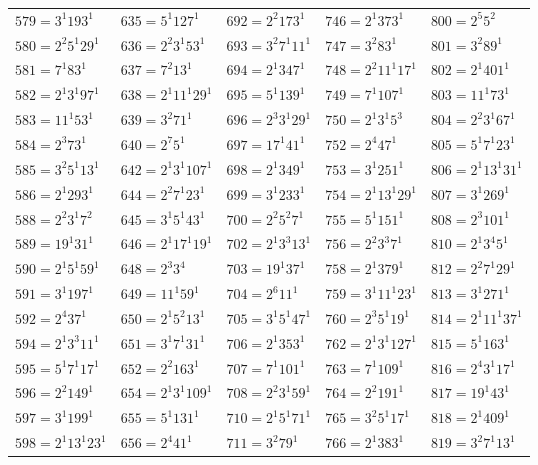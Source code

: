 {\begin{longtable}[c]{*{5}{l}}
$579=3^{1}193^{1}$&$635=5^{1}127^{1}$&$692=2^{2}173^{1}$&$746=2^{1}373^{1}$&$800=2^{5}5^{2}$\\
$580=2^{2}5^{1}29^{1}$&$636=2^{2}3^{1}53^{1}$&$693=3^{2}7^{1}11^{1}$&$747=3^{2}83^{1}$&$801=3^{2}89^{1}$\\
$581=7^{1}83^{1}$&$637=7^{2}13^{1}$&$694=2^{1}347^{1}$&$748=2^{2}11^{1}17^{1}$&$802=2^{1}401^{1}$\\
$582=2^{1}3^{1}97^{1}$&$638=2^{1}11^{1}29^{1}$&$695=5^{1}139^{1}$&$749=7^{1}107^{1}$&$803=11^{1}73^{1}$\\
$583=11^{1}53^{1}$&$639=3^{2}71^{1}$&$696=2^{3}3^{1}29^{1}$&$750=2^{1}3^{1}5^{3}$&$804=2^{2}3^{1}67^{1}$\\
$584=2^{3}73^{1}$&$640=2^{7}5^{1}$&$697=17^{1}41^{1}$&$752=2^{4}47^{1}$&$805=5^{1}7^{1}23^{1}$\\
$585=3^{2}5^{1}13^{1}$&$642=2^{1}3^{1}107^{1}$&$698=2^{1}349^{1}$&$753=3^{1}251^{1}$&$806=2^{1}13^{1}31^{1}$\\
$586=2^{1}293^{1}$&$644=2^{2}7^{1}23^{1}$&$699=3^{1}233^{1}$&$754=2^{1}13^{1}29^{1}$&$807=3^{1}269^{1}$\\
$588=2^{2}3^{1}7^{2}$&$645=3^{1}5^{1}43^{1}$&$700=2^{2}5^{2}7^{1}$&$755=5^{1}151^{1}$&$808=2^{3}101^{1}$\\
$589=19^{1}31^{1}$&$646=2^{1}17^{1}19^{1}$&$702=2^{1}3^{3}13^{1}$&$756=2^{2}3^{3}7^{1}$&$810=2^{1}3^{4}5^{1}$\\
$590=2^{1}5^{1}59^{1}$&$648=2^{3}3^{4}$&$703=19^{1}37^{1}$&$758=2^{1}379^{1}$&$812=2^{2}7^{1}29^{1}$\\
$591=3^{1}197^{1}$&$649=11^{1}59^{1}$&$704=2^{6}11^{1}$&$759=3^{1}11^{1}23^{1}$&$813=3^{1}271^{1}$\\
$592=2^{4}37^{1}$&$650=2^{1}5^{2}13^{1}$&$705=3^{1}5^{1}47^{1}$&$760=2^{3}5^{1}19^{1}$&$814=2^{1}11^{1}37^{1}$\\
$594=2^{1}3^{3}11^{1}$&$651=3^{1}7^{1}31^{1}$&$706=2^{1}353^{1}$&$762=2^{1}3^{1}127^{1}$&$815=5^{1}163^{1}$\\
$595=5^{1}7^{1}17^{1}$&$652=2^{2}163^{1}$&$707=7^{1}101^{1}$&$763=7^{1}109^{1}$&$816=2^{4}3^{1}17^{1}$\\
$596=2^{2}149^{1}$&$654=2^{1}3^{1}109^{1}$&$708=2^{2}3^{1}59^{1}$&$764=2^{2}191^{1}$&$817=19^{1}43^{1}$\\
$597=3^{1}199^{1}$&$655=5^{1}131^{1}$&$710=2^{1}5^{1}71^{1}$&$765=3^{2}5^{1}17^{1}$&$818=2^{1}409^{1}$\\
$598=2^{1}13^{1}23^{1}$&$656=2^{4}41^{1}$&$711=3^{2}79^{1}$&$766=2^{1}383^{1}$&$819=3^{2}7^{1}13^{1}$\\

\end{longtable}}
